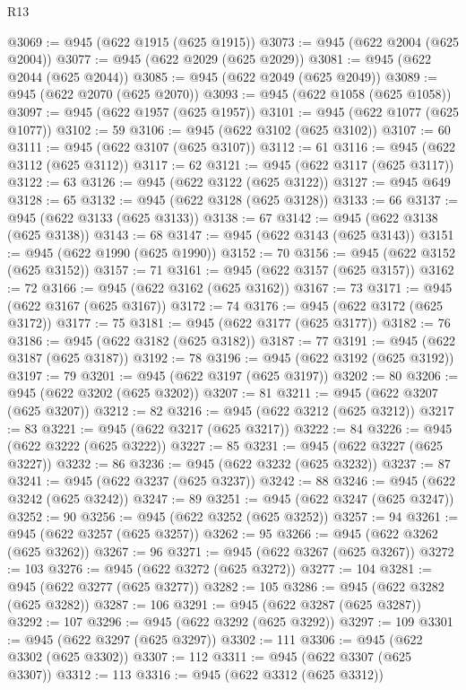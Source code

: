 \begin{lexlean}{R13}
\begin{coremodule}
@3069 := @945 (@622 @1915 (@625 @1915))
@3073 := @945 (@622 @2004 (@625 @2004))
@3077 := @945 (@622 @2029 (@625 @2029))
@3081 := @945 (@622 @2044 (@625 @2044))
@3085 := @945 (@622 @2049 (@625 @2049))
@3089 := @945 (@622 @2070 (@625 @2070))
@3093 := @945 (@622 @1058 (@625 @1058))
@3097 := @945 (@622 @1957 (@625 @1957))
@3101 := @945 (@622 @1077 (@625 @1077))
@3102 := 59
@3106 := @945 (@622 @3102 (@625 @3102))
@3107 := 60
@3111 := @945 (@622 @3107 (@625 @3107))
@3112 := 61
@3116 := @945 (@622 @3112 (@625 @3112))
@3117 := 62
@3121 := @945 (@622 @3117 (@625 @3117))
@3122 := 63
@3126 := @945 (@622 @3122 (@625 @3122))
@3127 := @945 @649
@3128 := 65
@3132 := @945 (@622 @3128 (@625 @3128))
@3133 := 66
@3137 := @945 (@622 @3133 (@625 @3133))
@3138 := 67
@3142 := @945 (@622 @3138 (@625 @3138))
@3143 := 68
@3147 := @945 (@622 @3143 (@625 @3143))
@3151 := @945 (@622 @1990 (@625 @1990))
@3152 := 70
@3156 := @945 (@622 @3152 (@625 @3152))
@3157 := 71
@3161 := @945 (@622 @3157 (@625 @3157))
@3162 := 72
@3166 := @945 (@622 @3162 (@625 @3162))
@3167 := 73
@3171 := @945 (@622 @3167 (@625 @3167))
@3172 := 74
@3176 := @945 (@622 @3172 (@625 @3172))
@3177 := 75
@3181 := @945 (@622 @3177 (@625 @3177))
@3182 := 76
@3186 := @945 (@622 @3182 (@625 @3182))
@3187 := 77
@3191 := @945 (@622 @3187 (@625 @3187))
@3192 := 78
@3196 := @945 (@622 @3192 (@625 @3192))
@3197 := 79
@3201 := @945 (@622 @3197 (@625 @3197))
@3202 := 80
@3206 := @945 (@622 @3202 (@625 @3202))
@3207 := 81
@3211 := @945 (@622 @3207 (@625 @3207))
@3212 := 82
@3216 := @945 (@622 @3212 (@625 @3212))
@3217 := 83
@3221 := @945 (@622 @3217 (@625 @3217))
@3222 := 84
@3226 := @945 (@622 @3222 (@625 @3222))
@3227 := 85
@3231 := @945 (@622 @3227 (@625 @3227))
@3232 := 86
@3236 := @945 (@622 @3232 (@625 @3232))
@3237 := 87
@3241 := @945 (@622 @3237 (@625 @3237))
@3242 := 88
@3246 := @945 (@622 @3242 (@625 @3242))
@3247 := 89
@3251 := @945 (@622 @3247 (@625 @3247))
@3252 := 90
@3256 := @945 (@622 @3252 (@625 @3252))
@3257 := 94
@3261 := @945 (@622 @3257 (@625 @3257))
@3262 := 95
@3266 := @945 (@622 @3262 (@625 @3262))
@3267 := 96
@3271 := @945 (@622 @3267 (@625 @3267))
@3272 := 103
@3276 := @945 (@622 @3272 (@625 @3272))
@3277 := 104
@3281 := @945 (@622 @3277 (@625 @3277))
@3282 := 105
@3286 := @945 (@622 @3282 (@625 @3282))
@3287 := 106
@3291 := @945 (@622 @3287 (@625 @3287))
@3292 := 107
@3296 := @945 (@622 @3292 (@625 @3292))
@3297 := 109
@3301 := @945 (@622 @3297 (@625 @3297))
@3302 := 111
@3306 := @945 (@622 @3302 (@625 @3302))
@3307 := 112
@3311 := @945 (@622 @3307 (@625 @3307))
@3312 := 113
@3316 := @945 (@622 @3312 (@625 @3312))

\end{coremodule}
\end{lexlean}
